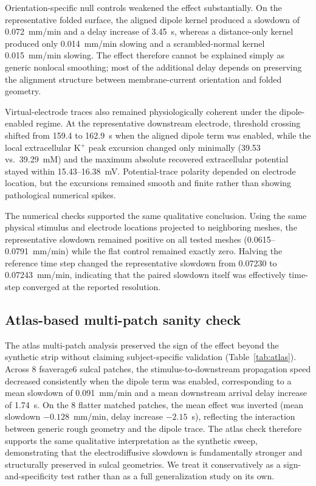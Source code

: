 \documentclass[12pt]{article}
\begin{document}
Orientation-specific null controls weakened the effect substantially. On the representative folded surface, the aligned dipole kernel produced a slowdown of 0.072~mm/min and a delay increase of 3.45~s, whereas a distance-only kernel produced only 0.014~mm/min slowing and a scrambled-normal kernel 0.015~mm/min slowing. The effect therefore cannot be explained simply as generic nonlocal smoothing; most of the additional delay depends on preserving the alignment structure between membrane-current orientation and folded geometry.

Virtual-electrode traces also remained physiologically coherent under the dipole-enabled regime. At the representative downstream electrode, threshold crossing shifted from 159.4 to 162.9~s when the aligned dipole term was enabled, while the local extracellular K$^+$ peak excursion changed only minimally (39.53 vs.~39.29~mM) and the maximum absolute recovered extracellular potential stayed within 15.43--16.38~mV. Potential-trace polarity depended on electrode location, but the excursions remained smooth and finite rather than showing pathological numerical spikes.

The numerical checks supported the same qualitative conclusion. Using the same physical stimulus and electrode locations projected to neighboring meshes, the representative slowdown remained positive on all tested meshes (0.0615--0.0791~mm/min) while the flat control remained exactly zero. Halving the reference time step changed the representative slowdown from 0.07230 to 0.07243~mm/min, indicating that the paired slowdown itself was effectively time-step converged at the reported resolution.

\subsection{Atlas-based multi-patch sanity check}

The atlas multi-patch analysis preserved the sign of the effect beyond the synthetic strip without claiming subject-specific validation (Table~\ref{tab:atlas}). Across 8 fsaverage6 sulcal patches, the stimulus-to-downstream propagation speed decreased consistently when the dipole term was enabled, corresponding to a mean slowdown of 0.091~mm/min and a mean downstream arrival delay increase of 1.74~s. On the 8 flatter matched patches, the mean effect was inverted (mean slowdown $-0.128$~mm/min, delay increase $-2.15$~s), reflecting the interaction between generic rough geometry and the dipole trace. The atlas check therefore supports the same qualitative interpretation as the synthetic sweep, demonstrating that the electrodiffusive slowdown is fundamentally stronger and structurally preserved in sulcal geometries. We treat it conservatively as a sign-and-specificity test rather than as a full generalization study on its own.
\end{document}
